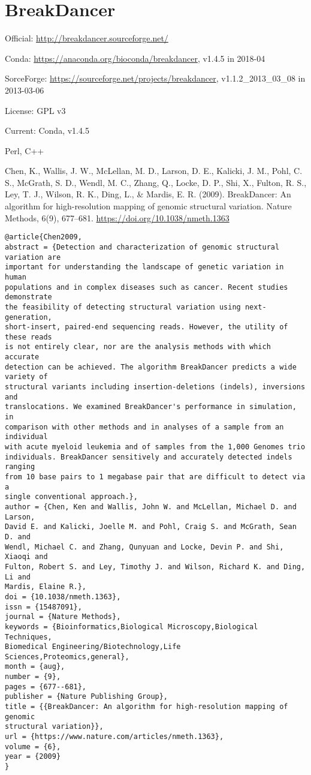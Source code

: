 \documentclass[]{article}
\begin{document}
\section{BreakDancer}

Official: \url{http://breakdancer.sourceforge.net/}

Conda: \url{https://anaconda.org/bioconda/breakdancer}, v1.4.5 in 2018-04

SorceForge: \url{https://sourceforge.net/projects/breakdancer}, v1.1.2\_2013\_03\_08 in 2013-03-06

License: GPL v3

Current: Conda, v1.4.5

Perl, C++

Chen, K., Wallis, J. W., McLellan, M. D., Larson, D. E., Kalicki, J. M., Pohl, C. S., McGrath, S. D., Wendl, M. C., Zhang, Q., Locke, D. P., Shi, X., Fulton, R. S., Ley, T. J., Wilson, R. K., Ding, L., \& Mardis, E. R. (2009). BreakDancer: An algorithm for high-resolution mapping of genomic structural variation. Nature Methods, 6(9), 677–681. \url{https://doi.org/10.1038/nmeth.1363}

\begin{verbatim}
@article{Chen2009,
abstract = {Detection and characterization of genomic structural variation are
important for understanding the landscape of genetic variation in human
populations and in complex diseases such as cancer. Recent studies demonstrate
the feasibility of detecting structural variation using next-generation,
short-insert, paired-end sequencing reads. However, the utility of these reads
is not entirely clear, nor are the analysis methods with which accurate
detection can be achieved. The algorithm BreakDancer predicts a wide variety of
structural variants including insertion-deletions (indels), inversions and
translocations. We examined BreakDancer's performance in simulation, in
comparison with other methods and in analyses of a sample from an individual
with acute myeloid leukemia and of samples from the 1,000 Genomes trio
individuals. BreakDancer sensitively and accurately detected indels ranging
from 10 base pairs to 1 megabase pair that are difficult to detect via a
single conventional approach.},
author = {Chen, Ken and Wallis, John W. and McLellan, Michael D. and Larson,
David E. and Kalicki, Joelle M. and Pohl, Craig S. and McGrath, Sean D. and
Wendl, Michael C. and Zhang, Qunyuan and Locke, Devin P. and Shi, Xiaoqi and
Fulton, Robert S. and Ley, Timothy J. and Wilson, Richard K. and Ding, Li and
Mardis, Elaine R.},
doi = {10.1038/nmeth.1363},
issn = {15487091},
journal = {Nature Methods},
keywords = {Bioinformatics,Biological Microscopy,Biological Techniques,
Biomedical Engineering/Biotechnology,Life Sciences,Proteomics,general},
month = {aug},
number = {9},
pages = {677--681},
publisher = {Nature Publishing Group},
title = {{BreakDancer: An algorithm for high-resolution mapping of genomic
structural variation}},
url = {https://www.nature.com/articles/nmeth.1363},
volume = {6},
year = {2009}
}
\end{verbatim}
\end{document}
